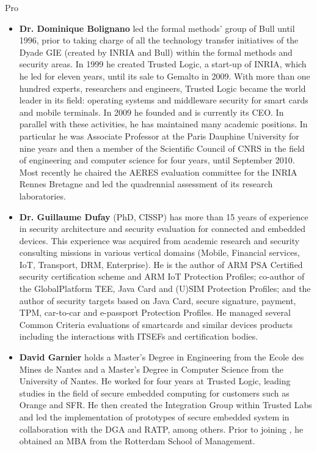 \begin{sitedescription}{Pro}
\begin{itemize} %

\item {\bf Dr. Dominique Bolignano} led the formal methods'
  group of Bull until 1996, prior to taking charge of all the
  technology transfer initiatives of the Dyade GIE (created by INRIA
  and Bull) within the formal methods and security areas. In 1999 he
  created Trusted Logic, a start-up of INRIA, which he led for eleven
  years, until its sale to Gemalto in 2009. With more than one hundred
  experts, researchers and engineers, Trusted Logic became the world
  leader in its field: operating systems and middleware security for
  smart cards and mobile terminals. In 2009 he founded \provenrun{} and
  is currently its CEO. In parallel with these activities, he has
  maintained many academic positions. In particular he was Associate
  Professor at the Paris Dauphine University for nine years and then a
  member of the Scientific Council of CNRS in the field of engineering
  and computer science for four years, until September 2010. Most
  recently he chaired the AERES evaluation committee for the INRIA
  Rennes Bretagne and led the quadrennial assessment of its research
  laboratories.

\item {\bf Dr. Guillaume Dufay} (PhD, CISSP) has more than 15 years of
  experience in security architecture and security evaluation for
  connected and embedded devices. This experience was acquired from
  academic research and security consulting missions in various
  vertical domains (Mobile, Financial services, IoT, Transport, DRM,
  Enterprise). He is the author of ARM PSA Certified security
  certification scheme and ARM IoT Protection Profiles; co-author of
  the GlobalPlatform TEE, Java Card and (U)SIM Protection Profiles;
  and the author of security targets based on Java Card, secure
  signature, payment, TPM, car-to-car and e-passport Protection
  Profiles. He managed several Common Criteria evaluations of
  smartcards and similar devices products including the interactions
  with ITSEFs and certification bodies.

\item {\bf David Garnier} holds a Master's Degree in Engineering from
  the Ecole des Mines de Nantes and a Master's Degree in Computer
  Science from the University of Nantes. He worked for four years at
  Trusted Logic, leading studies in the field of secure embedded
  computing for customers such as Orange and SFR. He then created the
  Integration Group within Trusted Labs and led the implementation of
  prototypes of secure embedded system in collaboration with the DGA
  and RATP, among others. Prior to joining \provenrun{}, he obtained an
  MBA from the Rotterdam School of Management.


\end{itemize}
\end{sitedescription}
